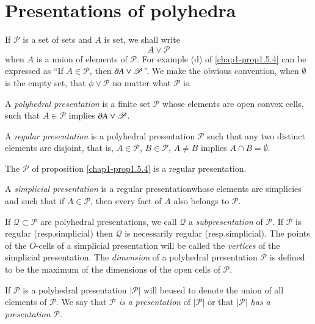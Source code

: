 \section{Presentations of polyhedra}\pageoriginale\label{chap1-sec1.6}

If $\mathscr{P}$ is a set of sets and $A$ is set, we shall write
$$
A\vee \mathscr{P}
$$
when $A$ is a union of elements of $\mathscr{P}$. For example (d) of \ref{chap1-prop1.5.4} can be expressed as ``If $A\in \mathscr{P}$, then $\partial A\vee \mathscr{P}$''. We make the obvious convention, when $\emptyset$ is the empty set, that $\phi\vee \mathscr{P}$ no matter what $\mathscr{P}$ is.

\begin{definition}\label{chap1-defi1.6.1}
A {\em polyhedral presentation} is a finite set $\mathscr{P}$ whose elements are open convex cells, such that $A\in \mathscr{P}$ implies $\partial A\vee \mathscr{P}$. 
\end{definition}

\begin{definition}\label{chap1-defi1.6.2}
A {\em regular presentation} is a polyhedral presentation $\mathscr{P}$ such that any two distinct elements are disjoint, that is, $A\in\mathscr{P}$, $B\in\mathscr{P}$, $A\neq B$ implies $A\cap B=\emptyset$.
\end{definition}

\begin{ex*}
The $\mathscr{P}$ of proposition \ref{chap1-prop1.5.4} is a regular presentation. 
\end{ex*}

\begin{definition}\label{chap1-defi1.6.3}
A {\em simplicial presentation} is a regular presentation\break whose elements are simplicies and such that if $A\in \mathscr{P}$, then every fact of $A$ also belongs to $\mathscr{P}$.
\end{definition}

If $\mathcal{Q}\subset \mathscr{P}$ are polyhedral presentations, we call $\mathcal{Q}$ a {\em subpresentation} of $\mathscr{P}$. If $\mathscr{P}$ is regular (resp.\@ simplicial) then $\mathcal{Q}$ is necessarily regular (resp.\@ simplicial). The points of the $O$-cells of a simplicial presentation will be called the {\em vertices} of the simplicial presentation. The {\em dimension} of a polyhedral presentation $\mathscr{P}$ is defined to be the maximum of the dimensions of the open cells of $\mathscr{P}$.

\begin{definition}\label{chap1-defi1.6.4}
If $\mathscr{P}$ is a polyhedral presentation $|\mathscr{P}|$ will be\pageoriginale used to denote the union of all elements of $\mathscr{P}$. We say that $\mathscr{P}$ {\em is a presentation} of $|\mathscr{P}|$ or that $|\mathscr{P}|$ {\em has a presentation} $\mathscr{P}$.
\end{definition}

